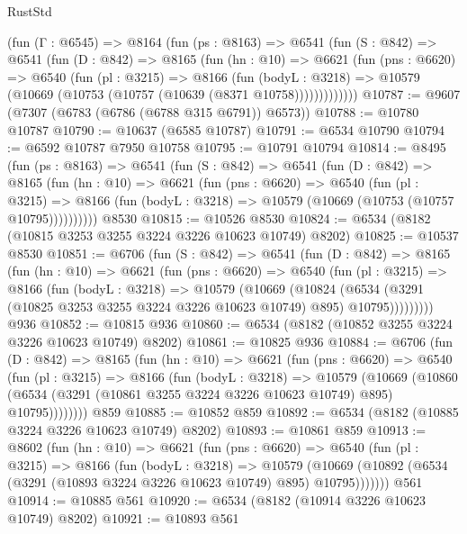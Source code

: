 \begin{lexlean}{RustStd}
\begin{coremodule}
    (fun (Γ : @6545) =>
    @8164
      (fun (ps : @8163) =>
      @6541
        (fun (S : @842) =>
        @6541
          (fun (D : @842) =>
          @8165
            (fun (hn : @10) =>
            @6621
              (fun (pns : @6620) =>
              @6540
                (fun (pl : @3215) =>
                @8166
                  (fun (bodyL : @3218) =>
                  @10579 (@10669 (@10753 (@10757 (@10639 (@8371 @10758)))))))))))))
@10787 := @9607 (@7307 (@6783 (@6786 (@6788 @315 @6791)) @6573))
@10788 := @10780 @10787
@10790 := @10637 (@6585 @10787)
@10791 := @6534 @10790
@10794 := @6592 @10787 @7950 @10758
@10795 := @10791 @10794
@10814 := @8495
    (fun (ps : @8163) =>
    @6541
      (fun (S : @842) =>
      @6541
        (fun (D : @842) =>
        @8165
          (fun (hn : @10) =>
          @6621
            (fun (pns : @6620) =>
            @6540
              (fun (pl : @3215) =>
              @8166 (fun (bodyL : @3218) => @10579 (@10669 (@10753 (@10757 @10795))))))))))
    @8530
@10815 := @10526 @8530
@10824 := @6534 (@8182 (@10815 @3253 @3255 @3224 @3226 @10623 @10749) @8202)
@10825 := @10537 @8530
@10851 := @6706
    (fun (S : @842) =>
    @6541
      (fun (D : @842) =>
      @8165
        (fun (hn : @10) =>
        @6621
          (fun (pns : @6620) =>
          @6540
            (fun (pl : @3215) =>
            @8166
              (fun (bodyL : @3218) =>
              @10579
                (@10669
                  (@10824
                    (@6534
                      (@3291 (@10825 @3253 @3255 @3224 @3226 @10623 @10749) @895)
                      @10795)))))))))
    @936
@10852 := @10815 @936
@10860 := @6534 (@8182 (@10852 @3255 @3224 @3226 @10623 @10749) @8202)
@10861 := @10825 @936
@10884 := @6706
    (fun (D : @842) =>
    @8165
      (fun (hn : @10) =>
      @6621
        (fun (pns : @6620) =>
        @6540
          (fun (pl : @3215) =>
          @8166
            (fun (bodyL : @3218) =>
            @10579
              (@10669
                (@10860 (@6534 (@3291 (@10861 @3255 @3224 @3226 @10623 @10749) @895) @10795))))))))
    @859
@10885 := @10852 @859
@10892 := @6534 (@8182 (@10885 @3224 @3226 @10623 @10749) @8202)
@10893 := @10861 @859
@10913 := @8602
    (fun (hn : @10) =>
    @6621
      (fun (pns : @6620) =>
      @6540
        (fun (pl : @3215) =>
        @8166
          (fun (bodyL : @3218) =>
          @10579
            (@10669 (@10892 (@6534 (@3291 (@10893 @3224 @3226 @10623 @10749) @895) @10795)))))))
    @561
@10914 := @10885 @561
@10920 := @6534 (@8182 (@10914 @3226 @10623 @10749) @8202)
@10921 := @10893 @561

\end{coremodule}
\end{lexlean}
